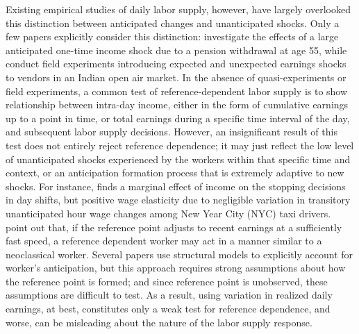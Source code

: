 \documentclass[reviewmode]{restud}
\begin{document}
Existing empirical studies of daily labor supply, however, have largely overlooked this distinction between anticipated changes and unanticipated shocks. Only a few papers explicitly consider this distinction: \citet{agarwal2017anticipated} investigate the effects of a large anticipated one-time income shock due to a pension withdrawal at age 55, while \citet{andersen2014toward} conduct field experiments  introducing expected and unexpected earnings shocks to vendors in an Indian open air market. In the absence of quasi-experiments or field experiments, a common test of reference-dependent labor supply is to show relationship between intra-day income, either in the form of cumulative earnings up to a point in time, or total earnings during a specific time interval of the day, and subsequent labor supply decisions. However, an insignificant result of this test does not entirely reject reference dependence; it may just reflect the low level of unanticipated shocks experienced by the workers within that specific time and context, or an anticipation formation process that is extremely adaptive to new shocks. For instance, \citet{farber2015you} finds a marginal effect of income on the stopping decisions in day shifts, but positive wage elasticity due to negligible variation in transitory unanticipated hour wage changes among New Year City (NYC) taxi drivers. \citet{thakral2018daily} point out that, if the reference point adjusts to recent earnings at a sufficiently fast speed, a reference dependent worker may act in a manner similar to a neoclassical worker. Several papers use structural models to explicitly account for worker's  anticipation, but this approach requires strong assumptions about how the reference point is formed; and since reference point is unobserved, these assumptions are difficult to test. As a result, using variation in realized daily earnings, at best, constitutes only a weak test for reference dependence, and worse, can be misleading about the nature of the labor supply response.
\end{document}
